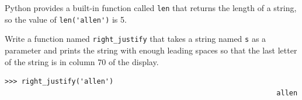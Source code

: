 \documentclass[10pt]{book}
\begin{document}
\begin{exercise}

Python provides a built-in function called {\tt len} that
returns the length of a string, so the value of \verb"len('allen')" is 5.

Write a function named \verb"right_justify" that takes a string
named {\tt s} as a parameter and prints the string with enough
leading spaces so that the last letter of the string is in column 70
of the display.

\begin{verbatim}
>>> right_justify('allen')
                                                                 allen
\end{verbatim}

\end{exercise}
\end{document}
